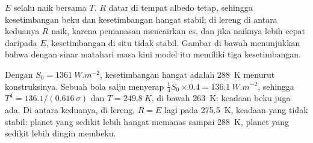 $E$ selalu naik bersama $T$. $R$ datar di tempat albedo tetap, sehingga kesetimbangan beku dan kesetimbangan
hangat stabil; di lereng di antara keduanya $R$ naik, karena pemanasan mencairkan es, dan jika naiknya
lebih cepat daripada $E$, kesetimbangan di situ tidak stabil. Gambar di bawah menunjukkan bahwa dengan sinar matahari
masa kini model itu memiliki tiga kesetimbangan.

\begin{example}\label{ex:b2:precambrian-earth:three}
Dengan $S_0 = \qty{1361}{W.m^{-2}}$, kesetimbangan hangat adalah \qty{288}{K} menurut konstruksinya. Sebuah
bola salju menyerap $\tfrac14 S_0\times0.4 = \qty{136.1}{W.m^{-2}}$, sehingga $T^4 =
136.1/(0.616\,\sigma)$ dan $T = \qty{249.8}{K}$, di bawah \qty{263}{K}: keadaan beku juga
ada. Di antara keduanya, di lereng, $R = E$ lagi pada \qty{275.5}{K}, keadaan yang tidak stabil:
planet yang sedikit lebih hangat memanas sampai \qty{288}{K}, planet yang sedikit lebih dingin membeku.
\end{example}

